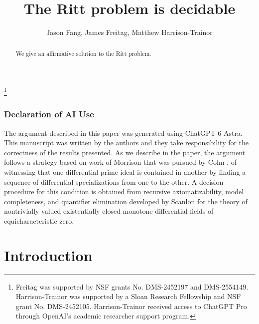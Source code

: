 \documentclass[12pt]{amsart}
\theoremstyle{definition}
\numberwithin{subcase}{cases}
\theoremstyle{remark}
\begin{document}
\title{The Ritt problem is decidable}
\author{Jason Fang, James Freitag, Matthew Harrison-Trainor}
\address{Jason Fang, Department of Pure Mathematics, University of Waterloo, j7fang@uwaterloo.ca.}
\address{James Freitag, Department of Mathematics, Statistics, and Computer Science, University of Illinois at Chicago, jfreitag@uic.edu.}
\address{Matthew Harrison-Trainor, Department of Mathematics, Statistics, and Computer Science, University of Illinois at Chicago, mht@uic.edu.}

\thanks{Freitag was supported by NSF grants No. DMS-2452197 and DMS-2554149. Harrison-Trainor was supported by a Sloan Research Fellowship and NSF grant No. DMS-2452105. Harrison-Trainor received access to ChatGPT Pro through OpenAI’s academic researcher support program.}

\makeatletter
\def\blfootnote{\xdef\@thefnmark{}\@footnotetext}
\makeatother

\maketitle

\begin{abstract}
We give an affirmative solution to the Ritt problem. 
\end{abstract}

\subsubsection*{Declaration of AI Use}

The argument described in this paper was generated using ChatGPT-6 Astra. This manuscript was written by the authors and they take responsibility for the correctness of the results presented. As we describe in the paper, the argument follows a strategy based on work of Morrison \cite{Morrison79} that was pursued by Cohn \cite{Cohn1986Valuations}, of witnessing that one differential prime ideal is contained in another by finding a sequence of differential specializations from one to the other. A decision procedure for this condition is obtained from recursive axiomatizability, model completeness, and quantifier elimination developed by Scanlon \cite{Scanlon00} for the theory of nontrivially valued existentially closed monotone differential fields of equicharacteristic zero.

\section{Introduction}
\end{document}
